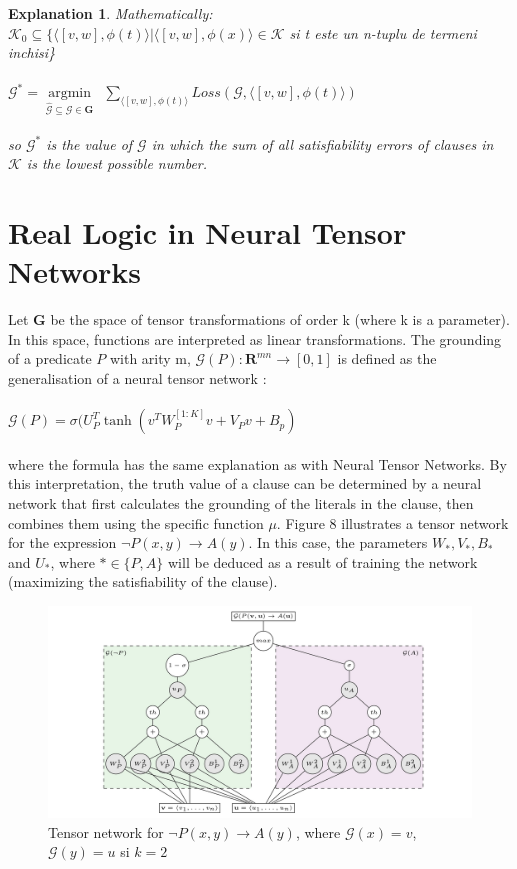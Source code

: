 \documentclass{article}
\newtheorem{explanado}{Explanation}[section]
\begin{document}
\begin{explanado}
Mathematically:\\
$\mathcal{K}_0 \subseteq \{ \langle [v, w], \phi(t) \rangle | \langle [v, w], \phi(x) \rangle \in \mathcal{K}$ si t este un n-tuplu de termeni inchisi\}\\ \\
$\mathcal{G}^* = \underset{\widehat{\mathcal{G}} \subseteq \mathcal{G} \in \mathbf{G}}{\operatorname{argmin}} \ \  \underset{\langle [v, w], \phi(t) \rangle}{\sum} Loss(\mathcal{G}, \langle[v, w], \phi(t) \rangle)$  \\ \\ so $\mathcal{G}^*$ is the value of $\mathcal{G}$ in which the sum of all satisfiability errors of clauses in $\mathcal{K}$ is the lowest possible number.
\end{explanado}

\section{Real Logic in Neural Tensor Networks}	
Let $\mathbf{G}$ be the space of tensor transformations of order k (where k is a parameter). In this space, functions are interpreted as linear transformations. The grounding of a predicate $P$ with arity m, $\mathcal{G}(P): \mathbf{R}^{mn} \rightarrow [0, 1]$ is defined as the generalisation of a neural tensor network \cite{NTN}: \\ \\
$\mathcal{G}(P) = \sigma (U_P^T \tanh(v^T W_P^{[1:K]} v + V_P v + B_p)$\\ \\
where the formula has the same explanation as with Neural Tensor Networks. By this interpretation, the truth value of a  clause can be determined  by a neural network that first calculates the grounding of the literals in the clause, then combines them using the specific function $\mu$. Figure 8 illustrates a tensor network for the expression $\neg P(x, y) \rightarrow A(y)$. In this case, the parameters $W_*, V_*, B_*$ and $U_*$, where $* \in \{P, A\}$ will be deduced as a result of training the network (maximizing the satisfiability of the clause). \cite{LTN}

\begin{figure}
	\includegraphics[scale=0.2]{ltn_exp}
	\caption{Tensor network for $\neg P(x, y) \rightarrow A(y)$, where $\mathcal{G}(x) = v$, $\mathcal{G}(y) = u$ si $k = 2$ \cite{LTN}}
\end{figure}
\end{document}
